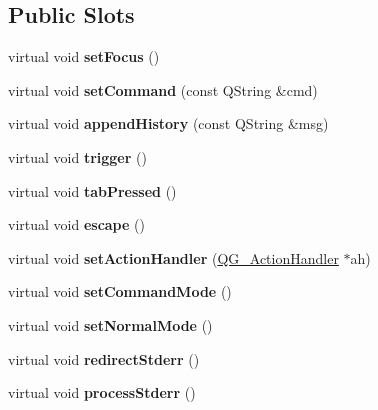 \subsection*{Public Slots}
\begin{DoxyCompactItemize}
\item 
\hypertarget{classQG__CommandWidget_a01456f0c16fc3ced0f0fc315a258d2f7}{virtual void {\bfseries set\-Focus} ()}\label{classQG__CommandWidget_a01456f0c16fc3ced0f0fc315a258d2f7}

\item 
\hypertarget{classQG__CommandWidget_adf71506b9344bafc0ca3c23f1319cb68}{virtual void {\bfseries set\-Command} (const Q\-String \&cmd)}\label{classQG__CommandWidget_adf71506b9344bafc0ca3c23f1319cb68}

\item 
\hypertarget{classQG__CommandWidget_a7ff8aa3bc6ce95b54eb8ef83ded7b285}{virtual void {\bfseries append\-History} (const Q\-String \&msg)}\label{classQG__CommandWidget_a7ff8aa3bc6ce95b54eb8ef83ded7b285}

\item 
\hypertarget{classQG__CommandWidget_a9d85a626de893b81dcde74f5b58c2ea5}{virtual void {\bfseries trigger} ()}\label{classQG__CommandWidget_a9d85a626de893b81dcde74f5b58c2ea5}

\item 
\hypertarget{classQG__CommandWidget_a535dea6924a66618bd1d8fe044db28a6}{virtual void {\bfseries tab\-Pressed} ()}\label{classQG__CommandWidget_a535dea6924a66618bd1d8fe044db28a6}

\item 
\hypertarget{classQG__CommandWidget_ad36116cb47eef237cb39a6174d2de90d}{virtual void {\bfseries escape} ()}\label{classQG__CommandWidget_ad36116cb47eef237cb39a6174d2de90d}

\item 
\hypertarget{classQG__CommandWidget_ad0f2a3486112ef6d49099119f8fa5ef2}{virtual void {\bfseries set\-Action\-Handler} (\hyperlink{classQG__ActionHandler}{Q\-G\-\_\-\-Action\-Handler} $\ast$ah)}\label{classQG__CommandWidget_ad0f2a3486112ef6d49099119f8fa5ef2}

\item 
\hypertarget{classQG__CommandWidget_a1419eb31dc4a9887ed70a247b8c99520}{virtual void {\bfseries set\-Command\-Mode} ()}\label{classQG__CommandWidget_a1419eb31dc4a9887ed70a247b8c99520}

\item 
\hypertarget{classQG__CommandWidget_ac9f1a5cee58fb7465d86f39d68e10608}{virtual void {\bfseries set\-Normal\-Mode} ()}\label{classQG__CommandWidget_ac9f1a5cee58fb7465d86f39d68e10608}

\item 
\hypertarget{classQG__CommandWidget_a624f4c68570508386025817b8bfa1393}{virtual void {\bfseries redirect\-Stderr} ()}\label{classQG__CommandWidget_a624f4c68570508386025817b8bfa1393}

\item 
\hypertarget{classQG__CommandWidget_af5de0aac1f2cf32d26acbcd4aa494619}{virtual void {\bfseries process\-Stderr} ()}\label{classQG__CommandWidget_af5de0aac1f2cf32d26acbcd4aa494619}

\end{DoxyCompactItemize}
